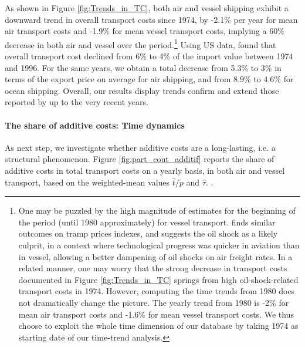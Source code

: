 \documentclass[a4paper,11pt]{article}
\begin{document}
As shown in Figure \ref{fig:Trends_in_TC}, both air and vessel shipping exhibit a downward trend in overall transport costs since 1974, by -2.1\% per year for mean air transport costs and -1.9\% for mean vessel transport costs, implying a 60\% decrease in both air and vessel over the period.\footnote{One may be puzzled by the high magnitude of estimates for the beginning of the period (until 1980 approximately) for vessel transport.
\cite{hummels2007} finds similar outcomes on tramp prices indexes, and suggests the oil shock as a likely culprit, in a context where technological progress was quicker in aviation than in vessel, allowing a better dampening of oil shocks on air freight rates.
In a related manner, one may worry that the strong decrease in transport costs documented in Figure \ref{fig:Trends_in_TC} springs from high oil-shock-related transport costs in 1974. However, computing the time trends from 1980 does not dramatically change the picture.
The yearly trend from 1980 is -2\% for mean air transport costs and -1.6\% for mean vessel transport costs.
We thus choose to exploit the whole time dimension of our database by taking 1974 as starting date of our time-trend analysis.} Using US data, \cite{Hummels_1999} found that overall transport cost declined from 6\% to 4\% of the import value between 1974 and 1996.
For the same years, we obtain a total decrease from 5.3\% to 3\% in terms of the export price on average for air shipping, and from 8.9\% to 4.6\% for ocean shipping. Overall, our results display trends confirm and extend those reported by \cite{Hummels_1999} up to the very recent years.\smallskip

\paragraph{The share of additive costs: Time dynamics} As next step, we investigate whether additive costs are a long-lasting, i.e. a structural phenomenon. Figure \ref{fig:part_cout_additif} reports the share of additive costs in total transport costs on a yearly basis, in both air and vessel transport, based on the weighted-mean values $\widehat{t}/\widetilde{p}$ and $\widehat{\tau}$.
.
\end{document}
